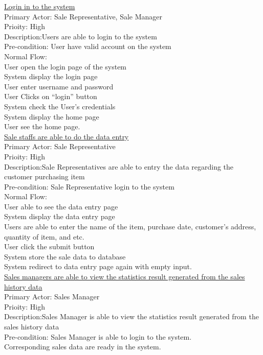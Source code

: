 \documentclass[12pt,letterpaper]{report}
\begin{document}
\underline{Login in to the system}\\
Primary Actor: Sale Representative, Sale Manager\\
Prioity: High\\
Description:Users are able to login to the system\\
Pre-condition: User have valid account on the system\\
Normal Flow: \\
User open the login page of the system\\
System display the login page\\
User enter username and password\\
User Clicks on “login” button\\
System check the User’s credentials\\
System display the home page\\
User see the home page.\\[1\baselineskip] \underline{Sale staffs are able to do the data entry}\\
Primary Actor: Sale Representative\\
Prioity: High\\
Description:Sale Representatives are able to entry the data regarding the customer purchasing item\\
Pre-condition: Sale Representative login to the system\\
Normal Flow: \\
User able to see the data entry page\\
System display the data entry page\\
Users are able to enter the name of the item, purchase date, customer’s address, quantity of item, and etc.\\
User click the submit button\\
System store the sale data to database\\
System redirect to data entry page again with empty input.\\[1\baselineskip] \underline{Sales managers are able to view the statistics result generated from the sales history data}\\
Primary Actor: Sales Manager\\
Prioity: High\\
Description:Sales Manager is able to view the statistics result generated from the sales history data\\
Pre-condition: Sales Manager is able to login to the system.\\ Corresponding sales data are ready in the system.\\
\end{document}
